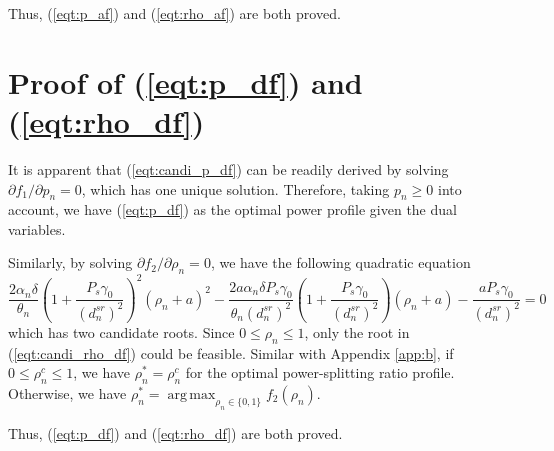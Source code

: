 \documentclass[12pt, draftclsnofoot, onecolumn]{IEEEtran}
\DeclareMathOperator*{\argmax}{arg\,max}
\begin{document}
Thus, (\ref{eqt:p_af}) and (\ref{eqt:rho_af}) are both proved.

\section{Proof of (\ref{eqt:p_df}) and (\ref{eqt:rho_df})}\label{app:c}
It is apparent that (\ref{eqt:candi_p_df}) can be readily derived by solving $\partial f_{1}/\partial p_{n}=0$, which has one unique solution. Therefore, taking $p_{n}\geq 0$ into account, we have (\ref{eqt:p_df}) as the optimal power profile given the dual variables.  

Similarly, by solving $\partial f_{2}/\partial \rho_{n}=0$, we have the following quadratic equation
\begin{equation}
\dfrac{2\alpha_{n}\delta}{\theta_{n}}(1+\dfrac{P_{s}\gamma_{0}}{(d^{sr}_{n})^{2}})^{2}(\rho_{n}+a)^{2}-
\dfrac{2a\alpha_{n}\delta P_{s}\gamma_{0}}{\theta_{n}(d^{sr}_{n})^{2}}(1+\dfrac{P_{s}\gamma_{0}}{(d^{sr}_{n})^{2}})(\rho_{n}+a)-\dfrac{aP_{s}\gamma_{0}}{(d^{sr}_{n})^{2}}=0
\end{equation}
which has two candidate roots. Since $0\leq\rho_{n}\leq 1$, only the root in (\ref{eqt:candi_rho_df}) could be feasible. Similar with Appendix \ref{app:b}, if $0\leq\rho^{c}_{n}\leq 1$, we have $\rho^{*}_{n}=\rho^{c}_{n}$ for the optimal power-splitting ratio profile. Otherwise, we have $\rho^{*}_{n}=\mathop{\argmax}_{\rho_{n}\in\{0,1\}}f_{2}(\rho_{n})$.

Thus, (\ref{eqt:p_df}) and (\ref{eqt:rho_df}) are both proved.
\end{document}
